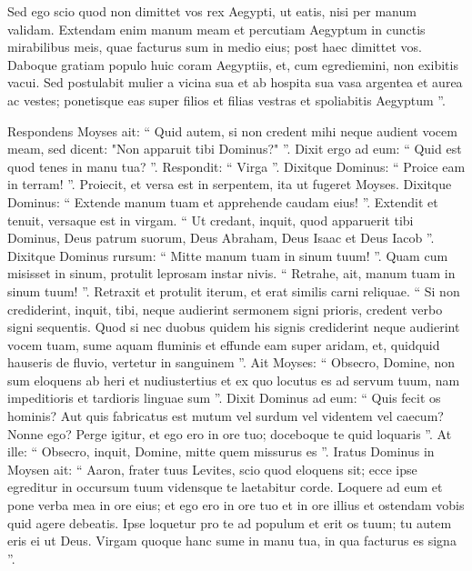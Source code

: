 \begin{biblechapter}
\begin{biblechapter}
\begin{biblechapter}
 \verse Sed ego scio quod non dimittet vos rex Aegypti, ut eatis, nisi per manum validam. 
\verse Extendam enim manum meam et percutiam Aegyptum in cunctis mirabilibus meis, quae facturus sum in medio eius; post haec dimittet vos. 
 \verse Daboque gratiam populo huic coram Aegyptiis, et, cum egrediemini, non exibitis vacui. 
\verse Sed postulabit mulier a vicina sua et ab hospita sua vasa argentea et aurea ac vestes; ponetisque eas super filios et filias vestras et spoliabitis Aegyptum ”.
 
\begin{biblechapter}
\verse Respondens Moyses ait: “ Quid autem, si non credent mihi neque audient vocem meam, sed dicent: "Non apparuit tibi Dominus?" ”. 
\verse Dixit ergo ad eum: “ Quid est quod tenes in manu tua? ”. Respondit: “ Virga ”. 
\verse Dixitque Dominus: “ Proice eam in terram! ”. Proiecit, et versa est in serpentem, ita ut fugeret Moyses. 
\verse Dixitque Dominus: “ Extende manum tuam et apprehende caudam eius! ”. Extendit et tenuit, versaque est in virgam. 
\verse “ Ut credant, inquit, quod apparuerit tibi Dominus, Deus patrum suorum, Deus Abraham, Deus Isaac et Deus Iacob ”.
 \verse Dixitque Dominus rursum: “ Mitte manum tuam in sinum tuum! ”. Quam cum misisset in sinum, protulit leprosam instar nivis. 
\verse “ Retrahe, ait, manum tuam in sinum tuum! ”. Retraxit et protulit iterum, et erat similis carni reliquae. 
\verse “ Si non crediderint, inquit, tibi, neque audierint sermonem signi prioris, credent verbo signi sequentis. 
\verse Quod si nec duobus quidem his signis crediderint neque audierint vocem tuam, sume aquam fluminis et effunde eam super aridam, et, quidquid hauseris de fluvio, vertetur in sanguinem ”.
 \verse Ait Moyses: “ Obsecro, Domine, non sum eloquens ab heri et nudiustertius et ex quo locutus es ad servum tuum, nam impeditioris et tardioris linguae sum ”. 
\verse Dixit Dominus ad eum: “ Quis fecit os hominis? Aut quis fabricatus est mutum vel surdum vel videntem vel caecum? Nonne ego? 
\verse Perge igitur, et ego ero in ore tuo; doceboque te quid loquaris ”. 
\verse At ille: “ Obsecro, inquit, Domine, mitte quem missurus es ”. 
\verse Iratus Dominus in Moysen ait: “ Aaron, frater tuus Levites, scio quod eloquens sit; ecce ipse egreditur in occursum tuum vidensque te laetabitur corde. 
\verse Loquere ad eum et pone verba mea in ore eius; et ego ero in ore tuo et in ore illius et ostendam vobis quid agere debeatis. 
\verse Ipse loquetur pro te ad populum et erit os tuum; tu autem eris ei ut Deus. 
\verse Virgam quoque hanc sume in manu tua, in qua facturus es signa ”.

\end{biblechapter}
\end{biblechapter}
\end{biblechapter}
\end{biblechapter}
